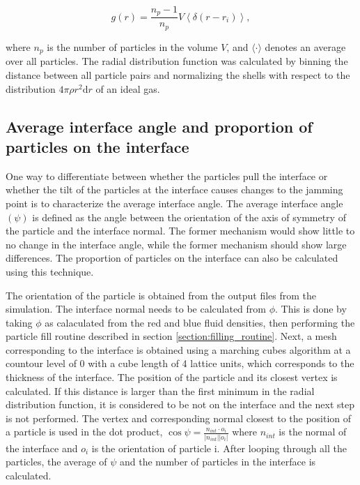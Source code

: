 \begin{equation}
    g(r) = \frac{n_p-1}{n_p} V \left\langle\delta\left(r-r_i\right)\right\rangle ,
\end{equation}

where \(n_p\) is the number of particles in the volume
\(V\), and \(\langle\cdot\rangle\) denotes an average over all
particles. The radial distribution function was calculated by binning
the distance between all particle pairs and normalizing the shells with
respect to the distribution \(4\pi \rho r^2 \mathrm{d}r\) of an ideal
gas. 

\subsection{Average interface angle and proportion of particles on the interface}
\label{section:interface_angle}

One way to differentiate between whether the particles pull the interface or whether the tilt of the particles at 
the interface causes changes to the jamming point is to characterize the average interface angle. The average interface 
angle $(\psi)$ is defined as the angle between the orientation of the axis of symmetry of the particle and the interface 
normal. The former mechanism would show little to no change in the interface angle, while the former mechanism should 
show large differences. The proportion of particles on the interface can also be calculated using this technique. 

The orientation of the particle is obtained from the output files from the simulation. The interface normal needs to 
be calculated from $\phi$. This is done by taking $\phi$ as calaculated from the red and blue fluid densities, then 
performing the particle fill routine described in section \ref{section:filling_routine}. Next, a mesh corresponding 
to the interface is obtained using a marching cubes algorithm at a countour level of 0 with a cube length of 4 lattice 
units, which corresponds to the thickness of the interface. \cite{van_der_walt_scikit-image:_2014} The 
position of the particle and its closest vertex is calculated. If this distance is larger than the first minimum in 
the radial distribution function, it is considered to be not on the interface and the next step is not performed. The 
vertex and corresponding normal closest to the position of a particle is used in the dot product, 
$\cos{\psi} = \frac{n_{int} \cdot o_{i}}{|n_{int}| |o_i|}$ where $n_{int}$ is the normal of the interface and $o_i$ 
is the orientation of particle i. After looping through all the particles, the average of $\psi$ and the number of 
particles in the interface is calculated.

